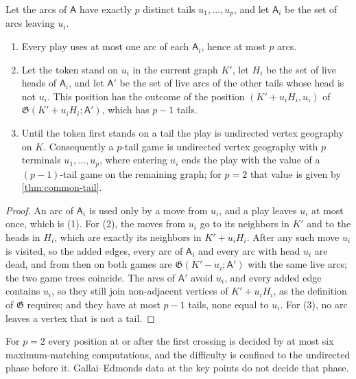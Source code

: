 \documentclass[final]{siamart0516}
\numberwithin{theorem}{section}
\numberwithin{equation}{section}
\theoremstyle{siamnonum}
\theoremstyle{plain}
\newcommand{\game}{\mathfrak{G}}          %
\newcommand{\arcs}{\mathsf{A}}            %
\begin{document}
\begin{lemma}[$p$ tails]\label{lem:p-tails}
Let the arcs of $\arcs$ have exactly $p$ distinct tails $u_1,\dots,u_p$, and let $\arcs_i$ be the set of arcs leaving $u_i$.
\begin{enumerate}[label=\textup{(\arabic*)}]
\item Every play uses at most one arc of each $\arcs_i$, hence at most $p$ arcs.
\item Let the token stand on $u_i$ in the current graph $K'$, let $H_i$ be the set of live heads of $\arcs_i$, and let $\arcs'$ be the set of live arcs of the other tails whose head is not $u_i$. This position has the outcome of the position $(K'+u_iH_i,u_i)$ of $\game(K'+u_iH_i;\arcs')$, which has $p-1$ tails.
\item Until the token first stands on a tail the play is undirected vertex geography on $K$. Consequently a $p$-tail game is undirected vertex geography with $p$ terminals $u_1,\dots,u_p$, where entering $u_i$ ends the play with the value of a $(p-1)$-tail game on the remaining graph; for $p=2$ that value is given by \cref{thm:common-tail}.
\end{enumerate}
\end{lemma}
\begin{proof}
An arc of $\arcs_i$ is used only by a move from $u_i$, and a play leaves $u_i$ at most once, which is (1). For (2), the moves from $u_i$ go to its neighbors in $K'$ and to the heads in $H_i$, which are exactly its neighbors in $K'+u_iH_i$. After any such move $u_i$ is visited, so the added edges, every arc of $\arcs_i$ and every arc with head $u_i$ are dead, and from then on both games are $\game(K'-u_i;\arcs')$ with the same live arcs; the two game trees coincide. The arcs of $\arcs'$ avoid $u_i$, and every added edge contains $u_i$, so they still join non-adjacent vertices of $K'+u_iH_i$, as the definition of $\game$ requires; and they have at most $p-1$ tails, none equal to $u_i$. For (3), no arc leaves a vertex that is not a tail.
\end{proof}

For $p=2$ every position at or after the first crossing is decided by at most six maximum-matching computations, and the difficulty is confined to the undirected phase before it. Gallai--Edmonds data at the key points do not decide that phase.
\end{document}
